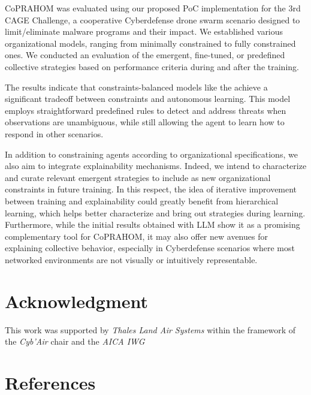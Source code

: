 \documentclass[conference]{IEEEtran}
\begin{document}
CoPRAHOM was evaluated using our proposed PoC implementation for the 3rd CAGE Challenge, a cooperative Cyberdefense drone swarm scenario designed to limit/eliminate malware programs and their impact. We established various organizational models, ranging from minimally constrained to fully constrained ones. We conducted an evaluation of the emergent, fine-tuned, or predefined collective strategies based on performance criteria during and after the training.

The results indicate that constraints-balanced models like the  achieve a significant tradeoff between constraints and autonomous learning. This model employs straightforward predefined rules to detect and address threats when observations are unambiguous, while still allowing the agent to learn how to respond in other scenarios.

In addition to constraining agents according to organizational specifications, we also aim to integrate explainability mechanisms. Indeed, we intend to characterize and curate relevant emergent strategies to include as new organizational constraints in future training. In this respect, the idea of iterative improvement between training and explainability could greatly benefit from hierarchical learning, which helps better characterize and bring out strategies during learning. Furthermore, while the initial results obtained with LLM show it as a promising complementary tool for CoPRAHOM, it may also offer new avenues for explaining collective behavior, especially in Cyberdefense scenarios where most networked environments are not visually or intuitively representable.




\section*{Acknowledgment}

This work was supported by \emph{Thales Land Air Systems} within the framework of the \emph{Cyb'Air} chair and the \emph{AICA IWG}

\section*{References}

% 



\end{document}
